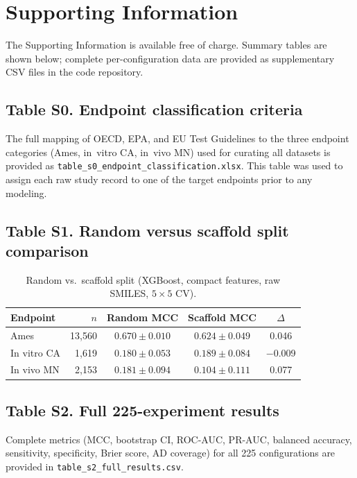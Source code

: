 \section*{Supporting Information}

The Supporting Information is available free of charge. Summary tables are shown below; 
complete per-configuration data are provided as supplementary CSV files in the code 
repository.

\subsection*{Table S0. Endpoint classification criteria}

The full mapping of OECD, EPA, and EU Test Guidelines to the three endpoint categories 
(Ames, in~vitro CA, in~vivo MN) used for curating all datasets is provided as 
\texttt{table\_s0\_endpoint\_classification.xlsx}. This table was used to assign each raw 
study record to one of the target endpoints prior to any modeling.

\subsection*{Table S1. Random versus scaffold split comparison}

\begin{table}[ht]
\caption{Random vs.\ scaffold split (XGBoost, compact features, raw SMILES, 
$5\!\times\!5$ CV).}
\centering
\small
\begin{tabular}{@{}lrccc@{}}
\toprule
Endpoint    & $n$    & Random MCC        & Scaffold MCC      & $\Delta$ \\
\midrule
Ames        & 13,560 & $0.670 \pm 0.010$ & $0.624 \pm 0.049$ &  0.046   \\
In vitro CA &  1,619 & $0.180 \pm 0.053$ & $0.189 \pm 0.084$ & $-$0.009 \\
In vivo MN  &  2,153 & $0.181 \pm 0.094$ & $0.104 \pm 0.111$ &  0.077   \\
\bottomrule
\end{tabular}
\end{table}

\subsection*{Table S2. Full 225-experiment results}

Complete metrics (MCC, bootstrap CI, ROC-AUC, PR-AUC, balanced accuracy, sensitivity, 
specificity, Brier score, AD coverage) for all 225 configurations are provided in 
\texttt{table\_s2\_full\_results.csv}.

